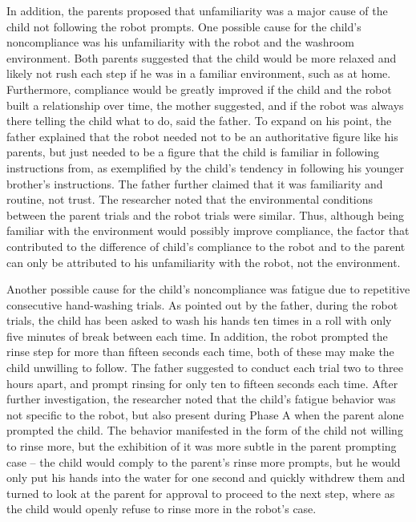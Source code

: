 \documentclass{ut-thesis}
\begin{document}
In addition, the parents proposed that unfamiliarity was a major cause of the child not following the robot prompts.  One possible cause for the child's noncompliance was his unfamiliarity with the robot and the washroom environment.  Both parents suggested that the child would be more relaxed and likely not rush each step if he was in a familiar environment, such as at home.  Furthermore, compliance would be greatly improved if the child and the robot built a relationship over time, the mother suggested, and if the robot was always there telling the child what to do, said the father.  To expand on his point, the father explained that the robot needed not to be an authoritative figure like his parents, but just needed to be a figure that the child is familiar in following instructions from, as exemplified by the child's tendency in following his younger brother's instructions.  The father further claimed that it was familiarity and routine, not trust.  The researcher noted that the environmental conditions between the parent trials and the robot trials were similar.  Thus, although being familiar with the environment would possibly improve compliance, the factor that contributed to the difference of child's compliance to the robot and to the parent can only be attributed to his unfamiliarity with the robot, not the environment.

Another possible cause for the child's noncompliance was fatigue due to repetitive consecutive hand-washing trials.  As pointed out by the father, during the robot trials, the child has been asked to wash his hands ten times in a roll with only five minutes of break between each time.  In addition, the robot prompted the rinse step for more than fifteen seconds each time, both of these may make the child unwilling to follow.  The father suggested to conduct each trial two to three hours apart, and prompt rinsing for only ten to fifteen seconds each time.  After further investigation, the researcher noted that the child's fatigue behavior was not specific to the robot, but also present during Phase A when the parent alone prompted the child.  The behavior manifested in the form of the child not willing to rinse more, but the exhibition of it was more subtle in the parent prompting case -- the child would comply to the parent's rinse more prompts, but he would only put his hands into the water for one second and quickly withdrew them and turned to look at the parent for approval to proceed to the next step, where as the child would openly refuse to rinse more in the robot's case.
\end{document}
